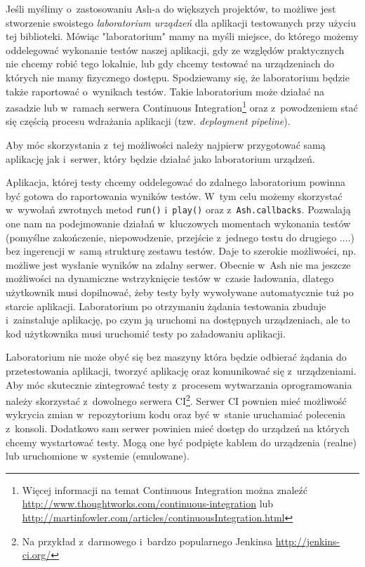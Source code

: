 \documentclass[brudnopis]{xmgr}
\begin{document}
Jeśli myślimy o~zastosowaniu Ash-a do większych projektów, to możliwe jest stworzenie swoistego \textit{laboratorium urządzeń} dla aplikacji testowanych przy użyciu tej biblioteki. Mówiąc "laboratorium" mamy na myśli miejsce, do którego możemy oddelegować wykonanie testów naszej aplikacji, gdy ze względów praktycznych nie chcemy robić tego lokalnie, lub gdy chcemy testować na urządzeniach do których nie mamy fizycznego dostępu. Spodziewamy się, że laboratorium będzie także raportować o~wynikach testów. Takie laboratorium może działać na zasadzie lub w~ramach serwera Continuous Integration\footnote{ Więcej informacji na temat Continuous Integration można znaleźć \url{http://www.thoughtworks.com/continuous-integration} lub \url{http://martinfowler.com/articles/continuousIntegration.html} } oraz z~powodzeniem stać się częścią procesu wdrażania aplikacji (tzw. \textit{deployment pipeline}).

Aby móc skorzystania z~tej możliwości należy najpierw przygotować samą aplikację jak i~serwer, który będzie działać jako laboratorium urządzeń. 

Aplikacja, której testy chcemy oddelegować do zdalnego laboratorium powinna być gotowa do raportowania wyników testów. W~tym celu możemy skorzystać w~wywołań zwrotnych metod \texttt{run()} i~\texttt{play()} oraz z~\texttt{Ash.callbacks}. Pozwalają one nam na podejmowanie działań w~kluczowych momentach wykonania testów (pomyślne zakończenie, niepowodzenie, przejście z~jednego testu do drugiego ....) bez ingerencji w~samą strukturę zestawu testów. Daje to szerokie możliwości, np. możliwe jest wysłanie wyników na zdalny serwer. Obecnie w~Ash nie ma jeszcze możliwości na dynamiczne wstrzyknięcie testów w~czasie ładowania, dlatego użytkownik musi dopilnować, żeby testy były wywoływane automatycznie tuż po starcie aplikacji. Laboratorium po otrzymaniu żądania testowania zbuduje i~zainstaluje aplikację, po czym ją uruchomi na dostępnych urządzeniach, ale to kod użytkownika musi uruchomić testy po załadowaniu aplikacji.

Laboratorium nie może obyć się bez maszyny która będzie odbierać żądania do przetestowania aplikacji, tworzyć aplikację oraz komunikować się z~urządzeniami. Aby móc skutecznie zintegrować testy z~procesem wytwarzania oprogramowania należy skorzystać z~dowolnego serwera CI\footnote{ Na przykład z~darmowego i~bardzo popularnego Jenkinsa \url{ http://jenkins-ci.org/} }. Serwer CI pownien mieć możliwość wykrycia zmian w~repozytorium kodu oraz być w~stanie uruchamiać polecenia z~konsoli. Dodatkowo sam serwer powinien mieć dostęp do urządzeń na których chcemy wystartować testy. Mogą one być podpięte kablem do urządzenia (realne) lub uruchomione w~systemie (emulowane). 
\end{document}
